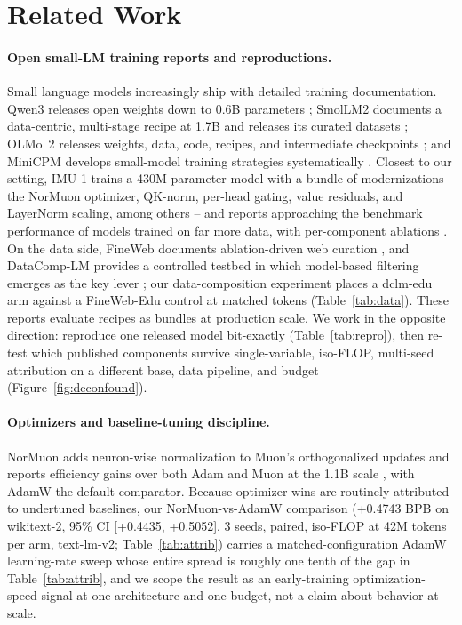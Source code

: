 \section{Related Work}\label{sec:related}

\paragraph{Open small-LM training reports and reproductions.}
Small language models increasingly ship with detailed training documentation. Qwen3 releases open weights down to 0.6B parameters \citep{yang2025qwen3}; SmolLM2 documents a data-centric, multi-stage recipe at 1.7B and releases its curated datasets \citep{allal2025smollm2}; OLMo~2 releases weights, data, code, recipes, and intermediate checkpoints \citep{olmo20242}; and MiniCPM develops small-model training strategies systematically \citep{hu2024minicpm}. Closest to our setting, IMU-1 trains a 430M-parameter model with a bundle of modernizations -- the NorMuon optimizer, QK-norm, per-head gating, value residuals, and LayerNorm scaling, among others -- and reports approaching the benchmark performance of models trained on far more data, with per-component ablations \citep{grigorev2026imu}. On the data side, FineWeb documents ablation-driven web curation \citep{penedo2024fineweb}, and DataComp-LM provides a controlled testbed in which model-based filtering emerges as the key lever \citep{li2024datacomp}; our data-composition experiment places a dclm-edu arm against a FineWeb-Edu control at matched tokens (Table~\ref{tab:data}). These reports evaluate recipes as bundles at production scale. We work in the opposite direction: reproduce one released model bit-exactly (Table~\ref{tab:repro}), then re-test which published components survive single-variable, iso-FLOP, multi-seed attribution on a different base, data pipeline, and budget (Figure~\ref{fig:deconfound}).

\paragraph{Optimizers and baseline-tuning discipline.}
NorMuon adds neuron-wise normalization to Muon's orthogonalized updates and reports efficiency gains over both Adam and Muon at the 1.1B scale \citep{li2025normuon}, with AdamW \citep{loshchilov2017decoupled} the default comparator. Because optimizer wins are routinely attributed to undertuned baselines, our NorMuon-vs-AdamW comparison (+0.4743 BPB on wikitext-2, 95\% CI [+0.4435, +0.5052], 3 seeds, paired, iso-FLOP at 42M tokens per arm, text-lm-v2; Table~\ref{tab:attrib}) carries a matched-configuration AdamW learning-rate sweep whose entire spread is roughly one tenth of the gap in Table~\ref{tab:attrib}, and we scope the result as an early-training optimization-speed signal at one architecture and one budget, not a claim about behavior at scale.

